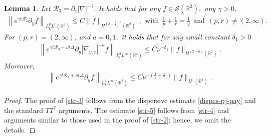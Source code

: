\documentclass[11pt,reqno]{article}
\newtheorem{lemm}[theo]{Lemma}
\numberwithin{equation}{section}
\newcommand\R{{\mathbb R}}
\let\pa=\partial
\let\f=\frac
\begin{document}
\begin{appendices}
\begin{lemm}\label{lem-str-2}
	Let $\mathcal{R}_3=\pa_z|\nabla|^{-1}$.
	It holds that for any  $f\in \mathcal{S}(\R^2),$ any $\gamma>0,$ 
	\begin{align}\label{str-3}
		\left\| e^{\gamma t\mathcal{R}_3}\pa_yf \right\|_{L^p_t L^r(\mathbb{R}^2)} \leq C \|f\|_{H^{(2-\f2r)^+}(\mathbb{R}^2)}\,,~~\text{with}~~\f1p+\f{1}{r}= \f12 ~~\text{and}~~ (p,r)\not=(2,\infty).
	\end{align}
		\noindent For $(p,r)=(2,\infty)$, and $a=0,1,$
    it holds that for any small constant $\delta_1>0$
	\begin{align}\label{str-4}	\left\| e^{\gamma t\mathcal{R}_3+\nu t\Delta}\pa_y|\nabla_{y,z}|^{-a}f \right\|_{L^2_t L^\infty(\mathbb{R}^2)} \leq C\nu^{-\delta_1} \|f\|_{H^{(2-a)}(\mathbb{R}^2)}.\end{align}
    Moreover, 
    \begin{align}\label{str-5}	
    \left\| e^{\gamma t\mathcal{R}_3+\nu t\Delta}\pa_yf \right\|_{L^1_t L^\infty(\mathbb{R}^2)} \leq C\nu^{-(\f12+\delta_1)} \|f\|_{H^{1}(\mathbb{R}^2)}.
    \end{align}
\end{lemm}
\begin{proof}
The proof of \eqref{str-3} follows from 
the dispersive estimate \eqref{dispes-pj-pay}
and the standard $TT^{*}$ arguments. The estimate 
\eqref{str-5} follows from \eqref{str-4} 
and arguments similar to those used in the proof of \eqref{str-2}; hence, we omit the details.

\end{proof}
\end{appendices}
\end{document}
